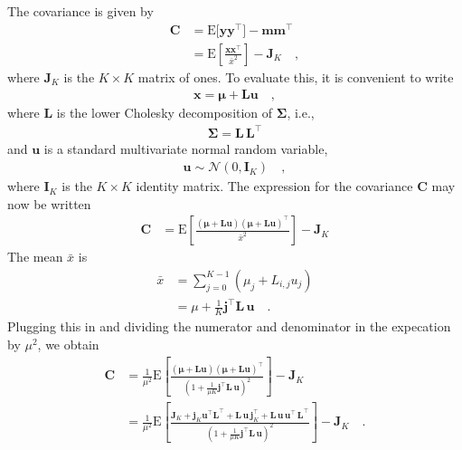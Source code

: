 \documentclass[modern]{aastex62}
\begin{document}
The covariance is given by
%
\begin{align}
    \mathbf{C}
     & =
    \mathrm{E}\big[ \mathbf{y} \mathbf{y}^\top \big]
    - \mathbf{m}\mathbf{m}^\top
    \nonumber \\[0.5em]
     & =
    \mathrm{E}\left[ \frac{\mathbf{x}\mathbf{x}^\top}{\bar{x}^2} \right]
    - \mathbf{J}_K
    \quad,
\end{align}
%
where $\mathbf{J}_K$ is the $K\times K$ matrix of ones.
To evaluate this, it is convenient to write
%
\begin{align}
    \mathbf{x} = \pmb{\mu} + \mathbf{L} \mathbf{u}
    \quad,
\end{align}
%
where $\mathbf{L}$ is the lower Cholesky decomposition of $\pmb{\Sigma}$,
i.e.,
%
\begin{align}
    \pmb{\Sigma} = \mathbf{L}\,\mathbf{L}^\top
\end{align}
%
and $\mathbf{u}$ is a standard multivariate normal random variable,
%
\begin{align}
    \mathbf{u} \sim \mathcal{N}\left( 0, \mathbf{I}_K \right)
    \quad,
\end{align}
%
where $\mathbf{I}_K$ is the
$K \times K$ identity matrix.
The expression for the covariance $\mathbf{C}$ may now be written
%
\begin{align}
    \mathbf{C}
     & =
    \mathrm{E}\left[
        \frac{
            (\pmb{\mu} + \mathbf{L} \mathbf{u})(\pmb{\mu} + \mathbf{L} \mathbf{u})^\top
        }{
            \bar{x}^2
        }
        \right]
    - \mathbf{J}_K
\end{align}
%
The mean $\bar{x}$ is
%
\begin{align}
    \bar{x} & = \sum\limits_{j=0}^{K-1}(\mu_j + L_{i,j}u_j)
    \nonumber                                               \\
            & =
    \mu + \frac{1}{K}\mathbf{j}^\top \mathbf{L} \, \mathbf{u}
    \quad.
\end{align}
%
Plugging this in and dividing the numerator and denominator in the expecation
by $\mu^2$, we obtain
%
\begin{align}
    \mathbf{C}
     & =
    \frac{1}{\mu^2}
    \mathrm{E}\left[
        \frac{
            (\pmb{\mu} + \mathbf{L} \mathbf{u})(\pmb{\mu} + \mathbf{L} \mathbf{u})^\top
        }{
            \left(1 + \frac{1}{\mu K}\mathbf{j}^\top \mathbf{L} \, \mathbf{u}\right)^2
        }
        \right]
    - \mathbf{J}_K
    \nonumber \\[0.5em]
     & =
    \frac{1}{\mu^2}
    \mathrm{E}\left[
        \frac{
            \mathbf{J}_K
            +
            \mathbf{j}_K\mathbf{u}^\top \mathbf{L}^\top
            +
            \mathbf{L} \, \mathbf{u} \, \mathbf{j}_K^\top
            +
            \mathbf{L} \, \mathbf{u} \, \mathbf{u}^\top \, \mathbf{L}^\top
        }{
            \left(1 + \frac{1}{\mu K}\mathbf{j}^\top \mathbf{L} \, \mathbf{u}\right)^2
        }
        \right]
    - \mathbf{J}_K
    \quad.
\end{align}
\end{document}
